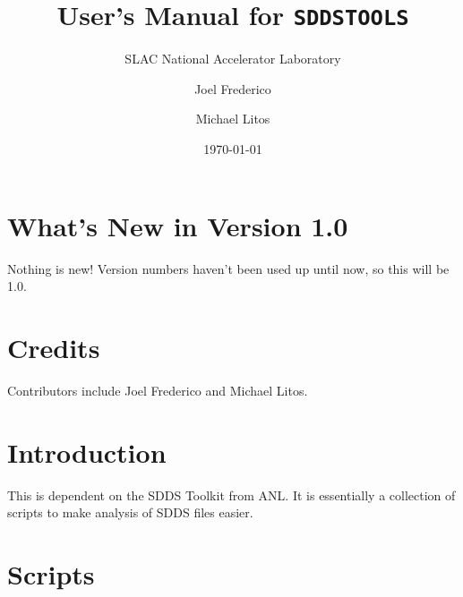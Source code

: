 \documentclass[11pt]{article}
\newcommand{\includeme}[1]{\newpage}
\begin{document}
\title{User's Manual for {\tt SDDSTOOLS}}
\author{SLAC National Accelerator Laboratory\date{\today}}
\author{Joel Frederico \and Michael Litos}
\maketitle

\section{What's New in Version 1.0}

Nothing is new!  Version numbers haven't been used up until now, so this will be 1.0.

\section{Credits}

Contributors include Joel Frederico and Michael Litos.

\section{Introduction}

This is dependent on the SDDS Toolkit from ANL.  It is essentially a collection of scripts to make analysis of SDDS files easier.

\newpage
\tableofcontents
\newpage

\section{Scripts}
	\includeme{batchCollimate.py}
	\includeme{concatlte.py}
	\includeme{concatlte.py}
	\includeme{countpages.sh}
	\includeme{fullsim.py}
	\includeme{gen_multi_par.py}
	\includeme{gen_par.sh}
	\includeme{plot_2dhist.sh}
	\includeme{plot_cent.sh}
	\includeme{plot_comp.sh}
	\includeme{plot_core.sh}
	\includeme{plot_gauss.sh}
	\includeme{plot_line.sh}
	\includeme{plot_scat.sh}
	\includeme{plot_twiss.sh}
	\includeme{pyplot_scat.py}
	\includeme{read_par.sh}
	\includeme{sdds2ascii.sh}
	\includeme{splitpipe.py}
	\includeme{submitPelegant.py}
\end{document}
